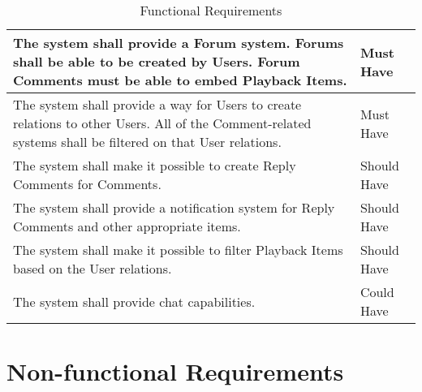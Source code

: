 \begin{table}[h!]
\begin{tabular}{|p{12cm}|p{3cm}|}
        \hline
        The system shall provide a Forum system. Forums shall be able to be created by Users. Forum Comments must be able to embed Playback Items. & Must Have \\
        \hline
        The system shall provide a way for Users to create relations to other Users. All of the Comment-related systems shall be filtered on that User relations. & Must Have \\
        \hline
        The system shall make it possible to create Reply Comments for Comments.                                                                                        & Should Have       \\
        \hline
        The system shall provide a notification system for Reply Comments and other appropriate items.                                                                                              & Should Have       \\
        \hline
        The system shall make it possible to filter Playback Items based on the User relations. & Should Have \\
        \hline
        The system shall provide chat capabilities.                                                                                                                     & Could Have        \\
        \hline
    \end{tabular}
    \caption{Functional Requirements}
\end{table}


\section{Non-functional Requirements}

